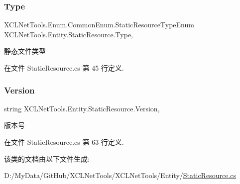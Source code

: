 \subsubsection{\texorpdfstring{Type}{Type}}
{\footnotesize\ttfamily X\+C\+L\+Net\+Tools.\+Enum.\+Common\+Enum.\+Static\+Resource\+Type\+Enum X\+C\+L\+Net\+Tools.\+Entity.\+Static\+Resource.\+Type\hspace{0.3cm}{\ttfamily [get]}, {\ttfamily [set]}}



静态文件类型 



在文件 Static\+Resource.\+cs 第 45 行定义.

\mbox{\label{class_x_c_l_net_tools_1_1_entity_1_1_static_resource_a4b85a7d2f6dc6169a10ebfe2987f2404}} 
\subsubsection{\texorpdfstring{Version}{Version}}
{\footnotesize\ttfamily string X\+C\+L\+Net\+Tools.\+Entity.\+Static\+Resource.\+Version\hspace{0.3cm}{\ttfamily [get]}, {\ttfamily [set]}}



版本号 



在文件 Static\+Resource.\+cs 第 63 行定义.



该类的文档由以下文件生成\+:\begin{DoxyCompactItemize}
\item 
D\+:/\+My\+Data/\+Git\+Hub/\+X\+C\+L\+Net\+Tools/\+X\+C\+L\+Net\+Tools/\+Entity/\hyperlink{_static_resource_8cs}{Static\+Resource.\+cs}\end{DoxyCompactItemize}
